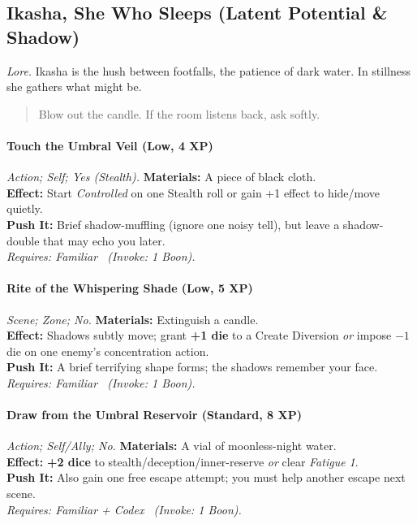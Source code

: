 \subsection{Ikasha, She Who Sleeps (Latent Potential \& Shadow)}
\textit{Lore.} Ikasha is the hush between footfalls, the patience of dark water. In stillness she gathers what might be.

\begin{quote}
Blow out the candle. If the room listens back, ask softly.
\end{quote}

\paragraph{Touch the Umbral Veil (Low, 4 XP)} \emph{Action; Self; Yes (Stealth).}
\textbf{Materials:} A piece of black cloth.\\
\textbf{Effect:} Start \emph{Controlled} on one Stealth roll or gain +1 effect to hide/move quietly.\\
\textbf{Push It:} Brief shadow-muffling (ignore one noisy tell), but leave a shadow-double that may echo you later.\\
\emph{Requires: Familiar \ (\textit{Invoke:} 1 Boon).}

\paragraph{Rite of the Whispering Shade (Low, 5 XP)} \emph{Scene; Zone; No.}
\textbf{Materials:} Extinguish a candle.\\
\textbf{Effect:} Shadows subtly move; grant \textbf{+1 die} to a Create Diversion \emph{or} impose \(-1\) die on one enemy’s concentration action.\\
\textbf{Push It:} A brief terrifying shape forms; the shadows remember your face.\\
\emph{Requires: Familiar \ (\textit{Invoke:} 1 Boon).}

\paragraph{Draw from the Umbral Reservoir (Standard, 8 XP)} \emph{Action; Self/Ally; No.}
\textbf{Materials:} A vial of moonless-night water.\\
\textbf{Effect:} \textbf{+2 dice} to stealth/deception/inner-reserve \emph{or} clear \emph{Fatigue 1}.\\
\textbf{Push It:} Also gain one free escape attempt; you must help another escape next scene.\\
\emph{Requires: Familiar + Codex \ (\textit{Invoke:} 1 Boon).}

